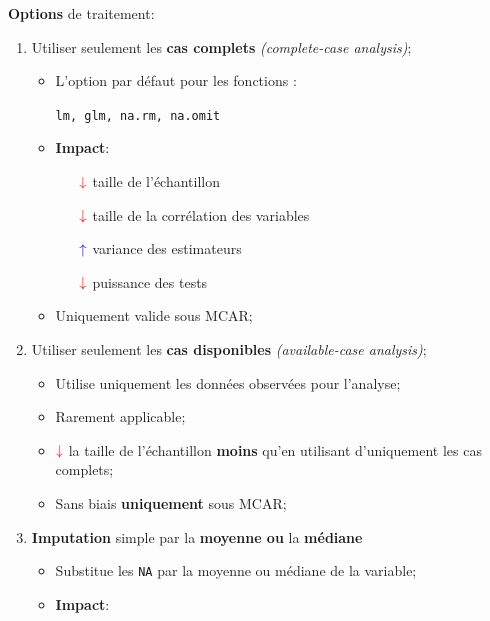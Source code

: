 \documentclass[10pt, french]{article}
\begin{document}
\begin{multicols*}{3}
\textbf{Options} de traitement:
\begin{enumerate}[leftmargin = *]
	\item	Utiliser seulement les \textbf{cas complets} \textit{(complete-case analysis)};
		\begin{itemize}[leftmargin = *]
		\item	L'option par défaut pour les fonctions :
			\begin{center}
			\texttt{lm, glm, na.rm, na.omit}
			\end{center}
		\item	\textbf{Impact}:
			\begin{itemize}[leftmargin = *]
			\item[$\color{red}\downarrow$]	taille de l'échantillon	\\
			\item[$\color{red}\downarrow$]	taille de la corrélation des variables	\\
			\item[$\color{blue}\uparrow$]	variance des estimateurs	\\
			\item[$\color{red}\downarrow$]	puissance des tests	\\
			\end{itemize}
		\item	Uniquement valide sous \textcolor{ao(english)}{MCAR};
		\end{itemize}
	\item	Utiliser seulement les \textbf{cas disponibles} \textit{(available-case analysis)};
		\begin{itemize}[leftmargin = *]
		\item	Utilise uniquement les données observées pour l'analyse;
		\item	Rarement applicable;
		\item	$\color{red}\downarrow$ la taille de l'échantillon \textbf{moins} qu'en utilisant d'uniquement les cas complets;
		\item	\textcolor{ao(english)}{Sans biais} \textbf{uniquement} sous \textcolor{ao(english)}{MCAR};
		\end{itemize}
	\item	\textbf{Imputation} simple par la \textbf{moyenne ou} la \textbf{médiane}
		\begin{itemize}[leftmargin = *]
		\item	Substitue les \texttt{NA} par la moyenne ou médiane de la variable;
		\item	\textbf{Impact}:
			\begin{itemize}[leftmargin = *]

\end{itemize}
\end{itemize}
\end{enumerate}
\end{multicols*}
\end{document}
